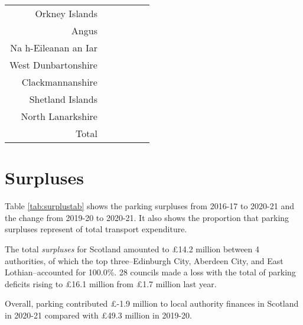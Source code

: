 \documentclass[
  12pt,
]{article}
\begin{document}
\begin{longtable}[t]{rrrrrr}
Orkney Islands & \cellcolor{white}{ 121.8\%} & \cellcolor{white}{  89.9\%} & \cellcolor{white}{  90.7\%} & \cellcolor{white}{  89.9\%} & \cellcolor{white}{ 229.0\%}\\
Angus & \cellcolor{white}{3166.7\%} & \cellcolor{white}{} & \cellcolor{white}{  39.6\%} & \cellcolor{white}{  35.4\%} & \cellcolor{white}{ 190.0\%}\\
Na h-Eileanan an Iar & \cellcolor{white}{ 283.3\%} & \cellcolor{white}{ 276.6\%} & \cellcolor{white}{ 155.4\%} & \cellcolor{white}{ 166.2\%} & \cellcolor{white}{ 575.0\%}\\
West Dunbartonshire & \cellcolor{white}{} & \cellcolor{white}{} & \cellcolor{white}{} & \cellcolor{white}{} & \cellcolor{white}{}\\
Clackmannanshire & \cellcolor{white}{} & \cellcolor{white}{} & \cellcolor{white}{ 130.3\%} & \cellcolor{white}{ 147.4\%} & \cellcolor{white}{ 216.7\%}\\
Shetland Islands & \cellcolor{white}{ 133.3\%} & \cellcolor{white}{  85.7\%} & \cellcolor{white}{ 253.8\%} & \cellcolor{white}{ 106.6\%} & \cellcolor{white}{ 192.3\%}\\
North Lanarkshire & \cellcolor{white}{} & \cellcolor{white}{} & \cellcolor{white}{} & \cellcolor{white}{} & \cellcolor{white}{}\\
\midrule
Total & \cellcolor{white}{  48.4\%} & \cellcolor{white}{  49.5\%} & \cellcolor{white}{  47.0\%} & \cellcolor{white}{  46.9\%} & \cellcolor{white}{ 104.5\%}\\*
\end{longtable}
\endgroup{}

\newpage

\hypertarget{surpluses}{%
\section{Surpluses}\label{surpluses}}

Table \ref{tab:surplustab} shows the parking surpluses from 2016-17 to 2020-21 and the change from 2019-20 to 2020-21. It also shows the proportion that parking surpluses represent of total transport expenditure.

The total \emph{surpluses} for Scotland amounted to £14.2 million between 4 authorities, of which the top three--Edinburgh City, Aberdeen City, and East Lothian--accounted for 100.0\%. 28 councils made a loss with the total of parking deficits rising to £16.1 million from £1.7 million last year.

Overall, parking contributed £-1.9 million to local authority finances in Scotland in 2020-21 compared with £49.3 million in 2019-20.
\end{document}
